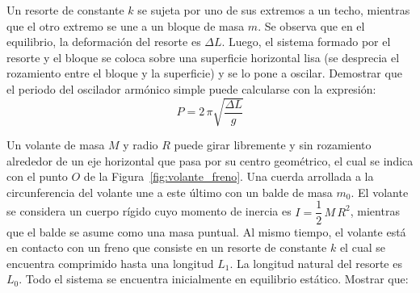 \documentclass[addpoints]{exam}
\begin{document}
\begin{questions}
    \question Un resorte de constante $k$ se sujeta por uno de sus extremos a un techo, mientras que el otro extremo se une a un bloque de masa $m$. Se observa que en el equilibrio, la deformación del resorte es $\Delta L$. Luego, el sistema formado por el resorte y el bloque se coloca sobre una superficie horizontal lisa (se desprecia el rozamiento entre el bloque y la superficie) y se lo pone a oscilar. Demostrar que el periodo del oscilador armónico simple puede calcularse con la expresión: $$ P = 2 \, \pi \sqrt{\frac{\Delta L}{g}} $$


    \pagebreak

    \question \label{ej:volante_freno} Un volante de masa $M$ y radio $R$ puede girar libremente y sin rozamiento alrededor de un eje horizontal que pasa por su centro geométrico, el cual se indica con el punto $O$ de la Figura~\ref{fig:volante_freno}. Una cuerda arrollada a la circunferencia del volante une a este último con un balde de masa $m_0$. El volante se considera un cuerpo rígido cuyo momento de inercia es $I = \dfrac{1}{2} \, M \, R^2$, mientras que el balde se asume como una masa puntual. Al mismo tiempo, el volante está en contacto con un freno que consiste en un resorte de constante $k$ el cual se encuentra comprimido hasta una longitud $L_1$. La longitud natural del resorte es $L_0$. Todo el sistema se encuentra inicialmente en equilibrio estático. Mostrar que:
\end{questions}
\end{document}
